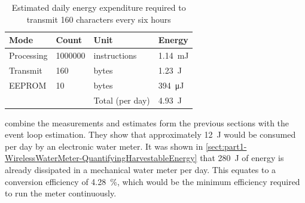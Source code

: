     \begin{table}
      \centering
      \begin{tabular}{|l|l|l|l|}
        \hline
        Mode & Count & Unit & Energy \\ \hline
        Processing & 1000000 & instructions & \SI{1.14}{\milli\joule} \\
        Transmit & 160 & bytes & \SI{1.23}{\joule} \\
        EEPROM & 10 & bytes & \SI{394}{\micro\joule} \\ \hline \hline
        &&Total (per day) & \SI{4.93}{\joule} \\ \hline
      \end{tabular}
      \caption{\label{tab:EnergyBudget-Transmission}Estimated daily energy expenditure required to transmit 160 characters every six hours}
    \end{table}

     combine the measurements and estimates form the previous sections with the event loop estimation.
    They show that approximately \SI{12}{\joule} would be consumed per day by an electronic water meter.
    It was shown in \cref{sect:part1-WirelessWaterMeter-QuantifyingHarvestableEnergy} that \SI{280}{\joule} of energy is already dissipated in a mechanical water meter per day.
    This equates to a conversion efficiency of \SI{4.28}{\percent}, which would be the minimum efficiency required to run the meter continuously.

